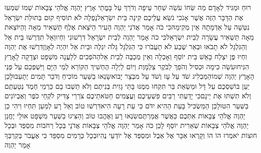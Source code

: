 \documentclass[../main/main.tex]{subfiles}
\begin{document}
\begin{multicols}{\ncols}
רוּחַ וּמַגִּיד לְאָדָם מַה שֵּׂחוֹ עֹשֵׂה שַׁחַר עֵיפָה וְדֹרֵךְ עַל בָּמֳתֵי אָרֶץ יַהְוֶה אֱלֹהֵי צְבָאוֹת שְׁמוֹ \ClosedSection{}שִׁמְעוּ אֶת הַדָּבָר הַזֶּה אֲשֶׁר אָנֹכִי נֹשֵׂא עֲלֵיכֶם קִינָה בֵּית יִשְׂרָאֵל\PreVerseSpace{}נָפְלָה לֹא תוֹסִיף קוּם בְּתוּלַת יִשְׂרָאֵל נִטְּשָׁה עַל אַדְמָתָהּ אֵין מְקִימָהּ\PreVerseSpace{}כִּי כֹה אָמַר אֲדֹנַי יַהְוֶה הָעִיר הַיֹּצֵאת אֶלֶף תַּשְׁאִיר מֵאָה וְהַיּוֹצֵאת מֵאָה תַּשְׁאִיר עֲשָׂרָה לְבֵית יִשְׂרָאֵל\PreVerseSpace{}כִּי כֹה אָמַר יַהְוֶה לְבֵית יִשְׂרָאֵל דִּרְשׁוּנִי וִחְיוּ\PreVerseSpace{}וְאַל תִּדְרְשׁוּ בֵּית אֵל וְהַגִּלְגָּל לֹא תָבֹאוּ וּבְאֵר שֶׁבַע לֹא תַעֲבֹרוּ כִּי הַגִּלְגָּל גָּלֹה יִגְלֶה וּבֵית אֵל יִהְיֶה לְאָוֶן\PreVerseSpace{}דִּרְשׁוּ אֶת יַהְוֶה וִחְיוּ פֶּן יִצְלַח כָּאֵשׁ בֵּית יוֹסֵף וְאָכְלָה וְאֵין מְכַבֶּה לְבֵית אֵל\PreVerseSpace{}הַהֹפְכִים לְלַעֲנָה מִשְׁפָּט וּצְדָקָה לָאָרֶץ הִנִּיחוּ\PreVerseSpace{}עֹשֵׂה כִימָה וּכְסִיל וְהֹפֵךְ לַבֹּקֶר צַלְמָוֶת וְיוֹם לַיְלָה הֶחְשִׁיךְ הַקּוֹרֵא לְמֵי הַיָּם וַיִּשְׁפְּכֵם עַל פְּנֵי הָאָרֶץ יַהְוֶה שְׁמוֹ\PreVerseSpace{}הַמַּבְלִיג שֹׁד עַל עָז וְשֹׁד עַל מִבְצָר יָבוֹא\PreVerseSpace{}שָׂנְאוּ בַשַּׁעַר מוֹכִיחַ וְדֹבֵר תָּמִים יְתָעֵבוּ\PreVerseSpace{}לָכֵן יַעַן בּוֹשַׁסְכֶם עַל דָּל וּמַשְׂאַת בַּר תִּקְחוּ מִמֶּנּוּ בָּתֵּי גָזִית בְּנִיתֶם וְלֹא תֵשְׁבוּ בָם כַּרְמֵי חֶמֶד נְטַעְתֶּם וְלֹא תִשְׁתּוּ אֶת יֵינָם\PreVerseSpace{}כִּי יָדַעְתִּי רַבִּים פִּשְׁעֵיכֶם וַעֲצֻמִים חַטֹּאתֵיכֶם צֹרְרֵי צַדִּיק לֹקְחֵי כֹפֶר וְאֶבְיוֹנִים בַּשַּׁעַר הִטּוּ\PreVerseSpace{}לָכֵן הַמַּשְׂכִּיל בָּעֵת הַהִיא יִדֹּם כִּי עֵת רָעָה הִיא\PreVerseSpace{}דִּרְשׁוּ טוֹב וְאַל רָע לְמַעַן תִּחְיוּ וִיהִי כֵן יַהְוֶה אֱלֹהֵי צְבָאוֹת אִתְּכֶם כַּאֲשֶׁר אֲמַרְתֶּם\PreVerseSpace{}שִׂנְאוּ רָע וְאֶהֱבוּ טוֹב וְהַצִּיגוּ בַשַּׁעַר מִשְׁפָּט אוּלַי יֶחֱנַן יַהְוֶה אֱלֹהֵי צְבָאוֹת שְׁאֵרִית יוֹסֵף \ClosedSection{}לָכֵן כֹּה אָמַר יַהְוֶה אֱלֹהֵי צְבָאוֹת אֲדֹנָי בְּכָל רְחֹבוֹת מִסְפֵּד וּבְכָל חוּצוֹת יֹאמְרוּ הוֹ הוֹ וְקָרְאוּ אִכָּר אֶל אֵבֶל וּמִסְפֵּד אֶל יוֹדְעֵי נֶהִי\PreVerseSpace{}וּבְכָל כְּרָמִים מִסְפֵּד כִּי אֶעֱבֹר בְּקִרְבְּךָ אָמַר יַהְוֶה\OpenSection{}\par

\end{multicols}
\end{document}

